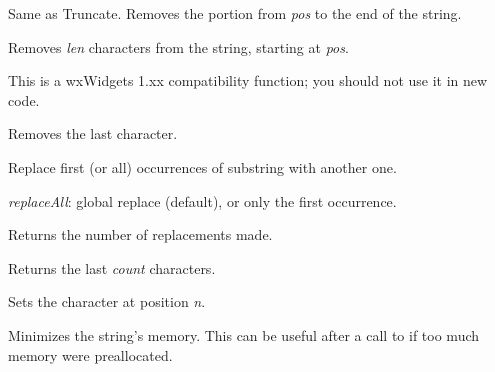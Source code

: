 \label{wxstringremove}


Same as Truncate. Removes the portion from {\it pos} to the end of the string.


Removes {\it len} characters from the string, starting at {\it pos}.

This is a wxWidgets 1.xx compatibility function; you should not use it in new code.


\label{wxstringremovelast}


Removes the last character.


\label{wxstringreplace}


Replace first (or all) occurrences of substring with another one.

{\it replaceAll}: global replace (default), or only the first occurrence.

Returns the number of replacements made.


\label{wxstringright}


Returns the last {\it count} characters.


\label{wxstringsetchar}


Sets the character at position {\it n}.


\label{wxstringshrink}


Minimizes the string's memory. This can be useful after a call to 
 if too much memory were preallocated.


\label{wxstringstartswith}


